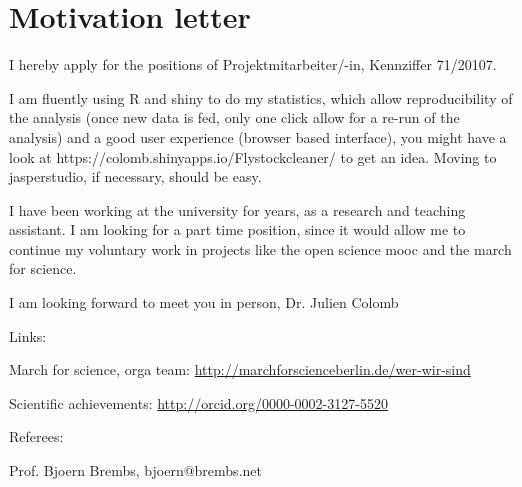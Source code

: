 \section* {Motivation letter}

I hereby apply for the positions of Projektmitarbeiter/-in, Kennziffer   71/20107.

\vspace {1cm} 

I am fluently using R and shiny to do my statistics, which allow reproducibility of the analysis (once new data is fed, only one click allow for a re-run of the analysis) and a good user experience (browser based interface), you might have a look at https://colomb.shinyapps.io/Flystockcleaner/ to get an idea. Moving to jasperstudio, if necessary, should be easy.

I have been working at the university for years, as a research and teaching assistant. I am looking for a part time position, since it would allow me to continue my voluntary work in projects like the open science mooc and the march for science. 

I am looking forward to meet you in person,
Dr. Julien Colomb

\vspace {1cm} 

Links:


March for science, orga team: \url{http://marchforscienceberlin.de/wer-wir-sind}

Scientific achievements: \url{http://orcid.org/0000-0002-3127-5520}

\vspace {0.5cm} 

Referees:

Prof. Bjoern Brembs, bjoern@brembs.net

